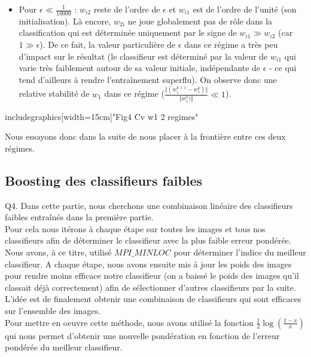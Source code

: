 \documentclass[a4paper,11pt]{article}
\begin{document}
\begin{itemize}
\begin{itemize}
		\item Pour $\epsilon \ll \frac{1}{10000}$ : $w_{i2}$ reste de l'ordre de $\epsilon$ et $w_{i1}$ est de l'ordre de l'unité (son initialisation). Là encore, $w_{2i}$ ne joue globalement pas de rôle dans la classification qui est déterminée uniquement par le signe de $w_{i1} \gg w_{i2}$ (car $1 \gg \epsilon$). De ce fait, la valeur particulière de $\epsilon$ dans ce régime a très peu d'impact sur le résultat (le classifieur est déterminé par la valeur de $w_{i1}$ qui varie très faiblement autour de sa valeur initiale, indépendante de $\epsilon$ - ce qui tend d'ailleurs à rendre l'entraînement superflu). On observe donc une relative stabilité de $w_1$ dans ce régime ($  \frac{\Vert(w_1^{k+1} - w_1^{k})\Vert}{\Vert w_1^{k})\Vert} \ll 1$). \\
	\end{itemize}
includegraphics[width=15cm]{"Fig4 Cv w1 2 regimes"}\\


\end{itemize}

Nous essayons donc dans la suite de nous placer à la frontière entre ces deux régimes.\\

\subsection{Boosting des classifieurs faibles}

Q4. Dans cette partie, nous cherchons une combinaison linéaire des classifieurs faibles entraînés dans la première partie.\\
Pour cela nous itérons à chaque étape sur toutes les images et tous nos classifieurs afin de déterminer le classifieur avec la plus faible erreur pondérée. Nous avons, à ce titre, utilisé $MPI\_MINLOC$ pour déterminer l’indice du meilleur classifieur. A chaque étape, nous avons ensuite mis à jour les poids des images pour rendre moins efficace notre classifieur (on a baissé le poids des images qu'il classait déjà correctement) afin de sélectionner d’autres classifieurs par la suite.\\
L’idée est de finalement obtenir une combinaison de classifieurs qui sont efficaces sur l’ensemble des images.\\

Pour mettre en oeuvre cette méthode, nous avons utilisé la fonction $\frac{1}{2}\log(\frac{1-x}{x})$ qui nous permet d'obtenir une nouvelle pondération en fonction de l’erreur pondérée du meilleur classifieur.\\
\end{document}
